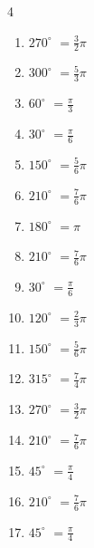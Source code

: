 \begin{multicols}{4}
\begin{enumerate}
  \item $\displaystyle 270^{\circ}$
        $\displaystyle =\frac{3}{2}\pi$

  \item $\displaystyle 300^{\circ}$
        $\displaystyle =\frac{5}{3}\pi$

  \item $\displaystyle 60^{\circ}$
        $\displaystyle =\frac{\pi}{3}$

  \item $\displaystyle 30^{\circ}$
        $\displaystyle =\frac{\pi}{6}$

  \item $\displaystyle 150^{\circ}$
        $\displaystyle =\frac{5}{6}\pi$

  \item $\displaystyle 210^{\circ}$
        $\displaystyle =\frac{7}{6}\pi$

  \item $\displaystyle 180^{\circ}$
        $\displaystyle =\pi$

  \item $\displaystyle 210^{\circ}$
        $\displaystyle =\frac{7}{6}\pi$

  \item $\displaystyle 30^{\circ}$
        $\displaystyle =\frac{\pi}{6}$

  \item $\displaystyle 120^{\circ}$
        $\displaystyle =\frac{2}{3}\pi$

  \item $\displaystyle 150^{\circ}$
        $\displaystyle =\frac{5}{6}\pi$

  \item $\displaystyle 315^{\circ}$
        $\displaystyle =\frac{7}{4}\pi$

  \item $\displaystyle 270^{\circ}$
        $\displaystyle =\frac{3}{2}\pi$

  \item $\displaystyle 210^{\circ}$
        $\displaystyle =\frac{7}{6}\pi$

\columnbreak %

  \item $\displaystyle 45^{\circ}$
        $\displaystyle =\frac{\pi}{4}$

  \item $\displaystyle 210^{\circ}$
        $\displaystyle =\frac{7}{6}\pi$

  \item $\displaystyle 45^{\circ}$
        $\displaystyle =\frac{\pi}{4}$


\end{enumerate}
\end{multicols}
